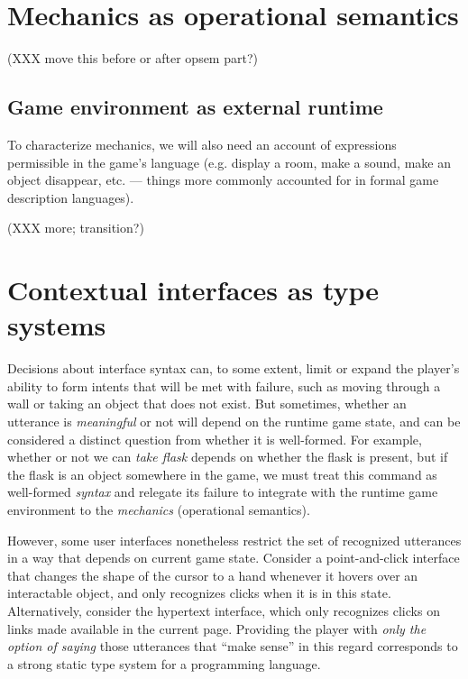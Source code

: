   \section{Mechanics as operational semantics}

  (XXX move this before or after opsem part?)
  \subsection{Game environment as external runtime}

  To characterize mechanics, we will also need an account of expressions
  permissible in the game's language (e.g. display a room, make a sound,
  make an object disappear, etc. --- things more commonly accounted for in
  formal game description languages). 

  (XXX more; transition?)
% 

  

  \section{Contextual interfaces as type systems}

  Decisions about interface syntax can, to some extent, limit or expand the
  player's ability to form intents that will be met with failure, such as
  moving through a wall or taking an object that does not exist. But
  sometimes, whether an utterance is {\em meaningful} or not will depend on
  the runtime game state, and can be considered a distinct question from whether it is
  well-formed. For example, whether or not we can {\em take
  flask} depends on whether the flask is present, but if the flask is an
  object somewhere in the game, we must treat this command as well-formed {\em
  syntax} and relegate its failure to integrate with the runtime game
  environment to the {\em mechanics} (operational semantics).

  However, some user interfaces nonetheless restrict the set of recognized
  utterances in a way that depends on current game state. Consider a
  point-and-click interface that changes the shape of the cursor to a hand
  whenever it hovers over an interactable object, and only recognizes
  clicks when it is in this state. Alternatively, consider the hypertext
  interface, which only recognizes clicks on links made available in the
  current page.  Providing the player with {\em only the option of saying}
  those utterances that ``make sense'' in this regard corresponds to a
  strong static type system for a programming language.

